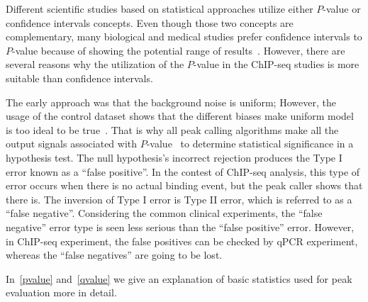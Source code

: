 Different scientific studies based on statistical approaches utilize either $P$-value or confidence intervals concepts. 
Even though those two concepts are complementary, many biological and medical studies prefer confidence intervals to $P$-value because of showing the potential range of results~\cite{feinstein1998p}.
However, there are several reasons why the utilization of the $P$-value in the ChIP-seq studies is more suitable than confidence intervals.


The early approach was that the background noise is uniform; 
However, the usage of the control dataset shows that the different biases make uniform model is too ideal to be true~\cite{robertson2007genome}. 
That is why all peak calling algorithms make all the output signals associated with $P$-value~\cite{chitpin2019recap} to determine statistical significance in a hypothesis test. 
The null hypothesis's incorrect rejection produces the Type I error known as a ``false positive''. 
In the contest of ChIP-seq analysis, this type of error occurs when there is no actual binding event, but the peak caller shows that there is. 
The inversion of Type I error is Type II error, which is referred to as a ``false negative''. 
Considering the common clinical experiments, the ``false negative'' error type is seen less serious than the ``false positive'' error.
However, in ChIP-seq experiment, the false positives can be checked by qPCR experiment, whereas the ``false negatives'' are going to be lost. 

In~\ref{pvalue} and~\ref{qvalue} we give an explanation of basic statistics used for peak evaluation more in detail.




